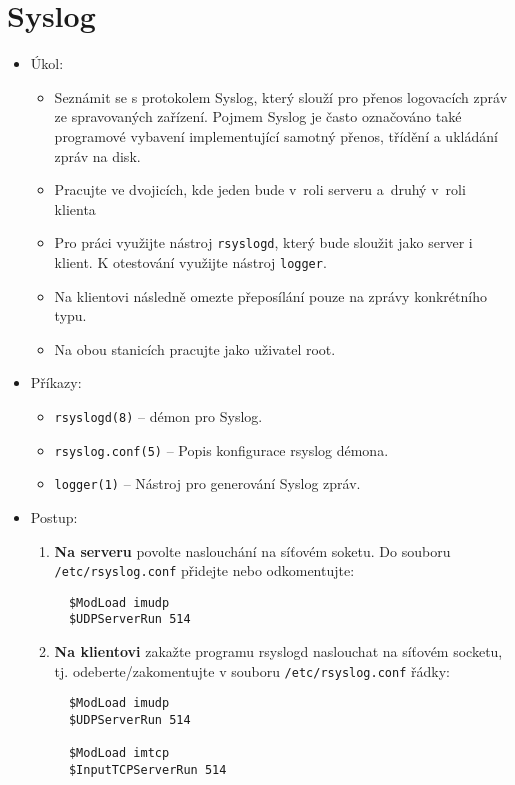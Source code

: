 \section{Syslog}
  \begin{itemize}
    \item Úkol: 
    \begin{itemize}
      \item Seznámit se s protokolem Syslog, který slouží pro přenos
      logovacích zpráv ze spravovaných zařízení. Pojmem Syslog je často označováno také
      programové vybavení implementující samotný přenos, třídění a ukládání zpráv na disk.
      \item Pracujte ve dvojicích, kde jeden bude v~roli serveru a~druhý v~roli klienta
      \item Pro práci využijte nástroj {\tt rsyslogd}, který bude sloužit jako server i klient.
      K otestování využijte nástroj {\tt logger}.
      \item Na klientovi následně omezte přeposílání pouze na zprávy konkrétního typu.
      \item Na obou stanicích pracujte jako uživatel root.
    \end{itemize}
    \item Příkazy:
       \begin{itemize}
            \item {\tt rsyslogd(8)} -- démon pro Syslog.
            \item {\tt rsyslog.conf(5)} -- Popis konfigurace rsyslog démona.
            \item {\tt logger(1)} -- Nástroj pro generování Syslog zpráv.
        \end{itemize}
    \item Postup:
       \begin{enumerate}
            \item {\bf Na serveru} povolte naslouchání na síťovém soketu. Do souboru {\tt /etc/rsyslog.conf} přidejte nebo odkomentujte:
\begin{verbatim}
  $ModLoad imudp
  $UDPServerRun 514
\end{verbatim}

            \item {\bf Na klientovi} zakažte programu rsyslogd naslouchat na síťovém socketu,
tj. odeberte/zakomentujte v souboru {\tt /etc/rsyslog.conf} řádky:
\begin{verbatim}
  $ModLoad imudp
  $UDPServerRun 514

  $ModLoad imtcp
  $InputTCPServerRun 514
\end{verbatim} 


\end{enumerate}
\end{itemize}
